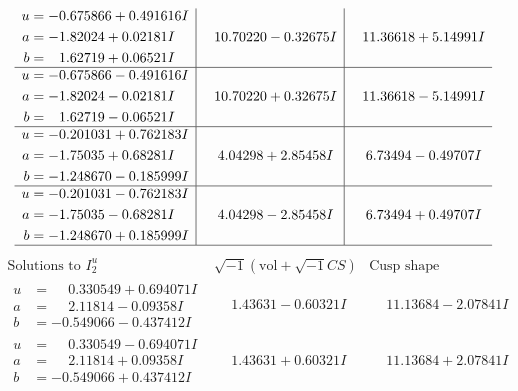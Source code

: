 \documentclass[1p]{elsarticle_modified}
\theoremstyle{definition}
\newcommand{\I}{\sqrt{-1}}
\begin{document}
$$\begin{array}{c|c|c}
\begin{aligned}
u &= -0.675866 + 0.491616 I \\
a &= -1.82024 + 0.02181 I \\
b &= \phantom{-}1.62719 + 0.06521 I\end{aligned}
 & \phantom{-}10.70220 - 0.32675 I & \phantom{-}11.36618 + 5.14991 I \\ \hline\begin{aligned}
u &= -0.675866 - 0.491616 I \\
a &= -1.82024 - 0.02181 I \\
b &= \phantom{-}1.62719 - 0.06521 I\end{aligned}
 & \phantom{-}10.70220 + 0.32675 I & \phantom{-}11.36618 - 5.14991 I \\ \hline\begin{aligned}
u &= -0.201031 + 0.762183 I \\
a &= -1.75035 + 0.68281 I \\
b &= -1.248670 - 0.185999 I\end{aligned}
 & \phantom{-}4.04298 + 2.85458 I & \phantom{-}6.73494 - 0.49707 I \\ \hline\begin{aligned}
u &= -0.201031 - 0.762183 I \\
a &= -1.75035 - 0.68281 I \\
b &= -1.248670 + 0.185999 I\end{aligned}
 & \phantom{-}4.04298 - 2.85458 I & \phantom{-}6.73494 + 0.49707 I\\
 \hline 
 \end{array}$$\newpage$$\begin{array}{c|c|c}  
\text{Solutions to }I^u_{2}& \I (\text{vol} + \sqrt{-1}CS) & \text{Cusp shape}\\
 \hline 
\begin{aligned}
u &= \phantom{-}0.330549 + 0.694071 I \\
a &= \phantom{-}2.11814 - 0.09358 I \\
b &= -0.549066 - 0.437412 I\end{aligned}
 & \phantom{-}1.43631 - 0.60321 I & \phantom{-}11.13684 - 2.07841 I \\ \hline\begin{aligned}
u &= \phantom{-}0.330549 - 0.694071 I \\
a &= \phantom{-}2.11814 + 0.09358 I \\
b &= -0.549066 + 0.437412 I\end{aligned}
 & \phantom{-}1.43631 + 0.60321 I & \phantom{-}11.13684 + 2.07841 I \\ \hline\begin{aligned}

\end{aligned}
\end{array}$$
\end{document}
